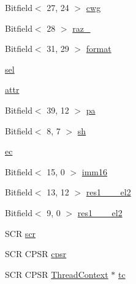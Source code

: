 \begin{DoxyCompactItemize}
\item 
Bitfield$<$ 27, 24 $>$ \hyperlink{namespaceArmISA_a7b52318da47fe1d6be02dea8b8ce4735}{cwg}
\item 
Bitfield$<$ 28 $>$ \hyperlink{namespaceArmISA_a33a3db607dc89d24426a9ce51186134c}{raz\_}
\item 
Bitfield$<$ 31, 29 $>$ \hyperlink{namespaceArmISA_ab04e190a18572fc68be418c377d68918}{format}
\item 
\hyperlink{namespaceArmISA_a299de4c1b75292c5dbcdf22a59e6c455}{sel}
\item 
\hyperlink{namespaceArmISA_a710acfac10f0042826d2d6d9c213ae7b}{attr}
\item 
Bitfield$<$ 39, 12 $>$ \hyperlink{namespaceArmISA_aec59a1cc2e7438586cdc39f4b30b0061}{pa}
\item 
Bitfield$<$ 8, 7 $>$ \hyperlink{namespaceArmISA_ae375ae4bca8c4da631387855d380343d}{sh}
\item 
\hyperlink{namespaceArmISA_a57e9c3fef3b6a734b69aa0db291bf2c7}{ec}
\item 
Bitfield$<$ 15, 0 $>$ \hyperlink{namespaceArmISA_aa9600d6f9d269bdfe16ca7ee7f955b17}{imm16}
\item 
Bitfield$<$ 13, 12 $>$ \hyperlink{namespaceArmISA_a364dedc814df31d662ce7d7357cbcad7}{res1\_\_\_\-el2}
\item 
Bitfield$<$ 9, 0 $>$ \hyperlink{namespaceArmISA_a2c2653504ccc3198bd64a08ddb71df3b}{res1\_\_\_\-el2}
\item 
SCR \hyperlink{namespaceArmISA_ace0bf26677706ecff809bd4c76d33c8c}{scr}
\item 
SCR CPSR \hyperlink{namespaceArmISA_ad377bf9b9c48f8cf3e8e918e0847b1fe}{cpsr}
\item 
SCR CPSR \hyperlink{classThreadContext}{ThreadContext} $\ast$ \hyperlink{namespaceArmISA_a5aff829af55e65b802d83dfcef4e9dd0}{tc}
\end{DoxyCompactItemize}
